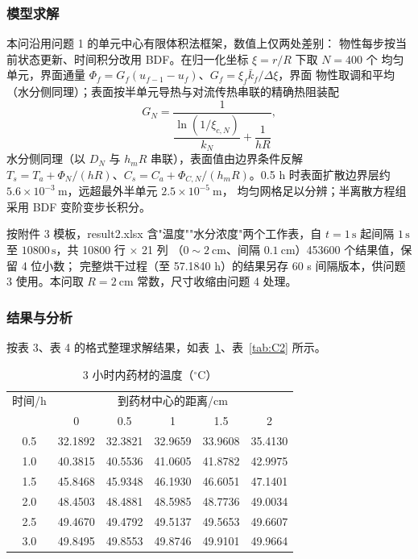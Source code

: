 \subsubsection{模型求解}

本问沿用问题 1 的单元中心有限体积法框架\cite{taowenquan2001}，数值上仅两处差别：
物性每步按当前状态更新、时间积分改用 BDF。在归一化坐标 $\xi=r/R$ 下取 $N=400$ 个
均匀单元，界面通量 $\Phi_f=G_f(u_{f-1}-u_f)$、$G_f=\xi_f\bar k_f/\Delta\xi$，界面
物性取调和平均（水分侧同理）；表面按半单元导热与对流传热串联的精确热阻装配
\begin{equation}
  G_N=\frac{1}{\dfrac{\ln(1/\xi_{c,N})}{k_N}+\dfrac{1}{hR}},
  \label{eq:GN2}
\end{equation}
水分侧同理（以 $D_N$ 与 $h_mR$ 串联），表面值由边界条件反解
$T_s=T_a+\Phi_N/(hR)$、$C_s=C_a+\Phi_{C,N}/(h_mR)$。0.5 h 时表面扩散边界层约
$5.6\times10^{-3}\ \mathrm{m}$，远超最外半单元 $2.5\times10^{-5}\ \mathrm{m}$，
均匀网格足以分辨；半离散方程组采用 BDF 变阶变步长积分。

按附件 3 模板，result2.xlsx 含"温度""水分浓度"两个工作表，自 $t=1\,\mathrm{s}$
起间隔 $1\,\mathrm{s}$ 至 $10800\,\mathrm{s}$，共 10800 行 $\times$ 21 列
（$0\sim2\ \mathrm{cm}$、间隔 $0.1\ \mathrm{cm}$）453600 个结果值，保留 4 位小数；
完整烘干过程（至 57.1840 h）的结果另存 60 s 间隔版本，供问题 3 使用。本问取
$R=2\ \mathrm{cm}$ 常数，尺寸收缩由问题 4 处理。

\subsubsection{结果与分析}

按表 3、表 4 的格式整理求解结果，如表~\ref{tab:T2}、表~\ref{tab:C2} 所示。

\begin{table}[htbp]
  \centering
  \caption{3 小时内药材的温度（$^{\circ}\mathrm{C}$）}
  \label{tab:T2}
  \begin{tabular}{cccccc}
    \hline
    时间/h & \multicolumn{5}{c}{到药材中心的距离/cm} \\
    & 0 & 0.5 & 1 & 1.5 & 2 \\
    \hline
    0.5 & 32.1892 & 32.3821 & 32.9659 & 33.9608 & 35.4130 \\
    1.0 & 40.3815 & 40.5536 & 41.0605 & 41.8782 & 42.9975 \\
    1.5 & 45.8468 & 45.9348 & 46.1930 & 46.6051 & 47.1401 \\
    2.0 & 48.4503 & 48.4881 & 48.5985 & 48.7736 & 49.0034 \\
    2.5 & 49.4670 & 49.4792 & 49.5137 & 49.5653 & 49.6607 \\
    3.0 & 49.8495 & 49.8553 & 49.8746 & 49.9101 & 49.9664 \\
    \hline
  \end{tabular}
\end{table}


